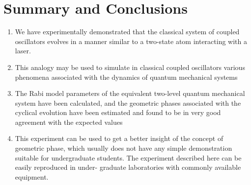 \chapter{\label{summary}Summary and Conclusions}
\begin{enumerate}
	\item We have experimentally demonstrated that the classical system of coupled oscillators evolves
	in a manner similar to a two-state atom interacting with a laser. 
	\item  This analogy may be used to
	simulate in classical coupled oscillators various phenomena associated with the dynamics of
	quantum mechanical systems
	\item  The Rabi model parameters of the equivalent two-level
	quantum mechanical system have been calculated, and the geometric phases associated with
	the cyclical evolution have been estimated and found to be in very good agreement with the
	expected values
	\item  This experiment can be used to get a better insight of the concept of
	geometric phase, which usually does not have any simple demonstration suitable for
	undergraduate students. The experiment described here can be easily reproduced in under-
	graduate laboratories with commonly available equipment.
\end{enumerate}

\setcounter{equation}{0}
\setcounter{table}{0}
\setcounter{figure}{0}


    



